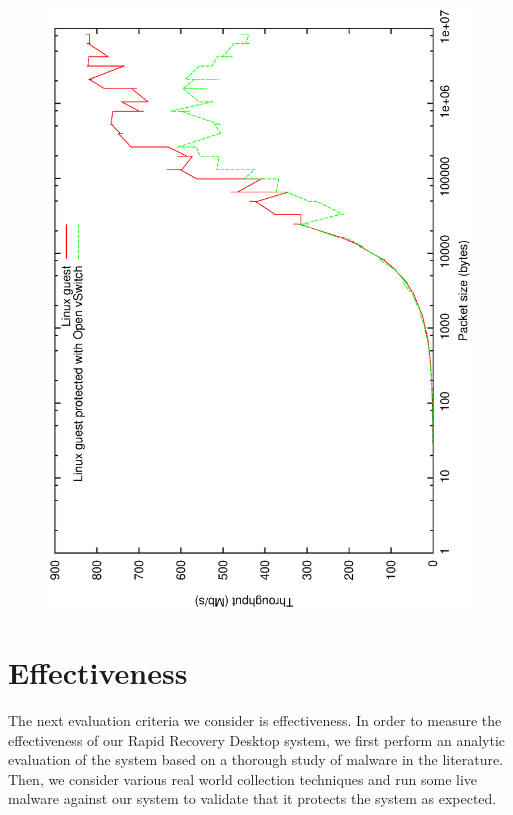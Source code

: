 \begin{figure}[tbp]
\begin{centering}
\label{fig:linux-network-ovs}
\includegraphics[scale=.7]{figs/linux-network-ovs}
\end{centering}
\end{figure}

\section{Effectiveness}
\label{sec:effectiveness}

The next evaluation criteria we consider is effectiveness. In order to measure the effectiveness of our Rapid Recovery Desktop system, we first perform an analytic evaluation of the system based on a thorough study of malware in the literature. Then, we consider various real world collection techniques and run some live malware against our system to validate that it protects the system as expected.

